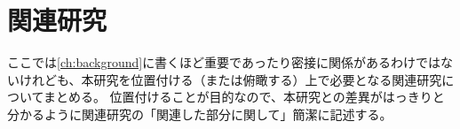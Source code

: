 \chapter{関連研究}\label{ch:relatedwork}

ここでは\cref{ch:background}に書くほど重要であったり密接に関係があるわけではないけれども、本研究を位置付ける（または俯瞰する）上で必要となる関連研究についてまとめる。
位置付けることが目的なので、本研究との差異がはっきりと分かるように関連研究の「関連した部分に関して」簡潔に記述する。